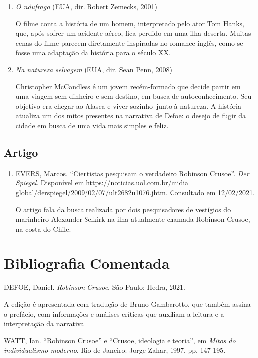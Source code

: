 \documentclass{article}
\begin{document}
\begin{enumerate}
\item
\emph{O náufrago} (EUA, dir. Robert Zemecks, 2001)

O filme conta a história de um homem, interpretado pelo ator Tom Hanks,
que, após sofrer um acidente aéreo, fica perdido em uma ilha deserta.
Muitas cenas do filme parecem diretamente inspiradas no romance inglês,
como se fosse uma adaptação da história para o século XX.

\item
\emph{Na natureza selvagem} (EUA, dir. Sean Penn, 2008)

Christopher McCandless é um jovem recém-formado que decide partir em uma
viagem sem dinheiro e sem destino, em busca de autoconhecimento. Seu
objetivo era chegar ao Alasca e viver sozinho~junto à natureza. A
história atualiza um dos mitos presentes na narrativa de Defoe: o desejo
de fugir da cidade em busca de uma vida mais simples e feliz.
\end{enumerate}

\subsection{Artigo}

\begin{enumerate}
\item
EVERS, Marcos. ``Cientistas pesquisam o verdadeiro Robinson Crusoe''.
\emph{Der Spiegel}. Disponível em https://noticias.uol.com.br/midia
global/derspiegel/2009/02/07/ult2682u1076.jhtm. Consultado em
12/02/2021.

O artigo fala da busca realizada por dois pesquisadores de vestígios do
marinheiro Alexander Selkirk na ilha atualmente chamada Robinson Crusoe,
na costa do Chile.
\end{enumerate}

\section{Bibliografia Comentada}

DEFOE, Daniel. \emph{Robinson Crusoe}. São Paulo: Hedra, 2021.

A edição é apresentada com tradução de Bruno Gambarotto, que também
assina o prefácio, com informações e análises críticas que auxiliam a
leitura e a interpretação da narrativa

WATT, Ian. ``Robinson Crusoe'' e ``Crusoe, ideologia e teoria'', em
\emph{Mitos do individualismo moderno}. Rio de Janeiro: Jorge Zahar,
1997, pp. 147-195.
\end{document}
